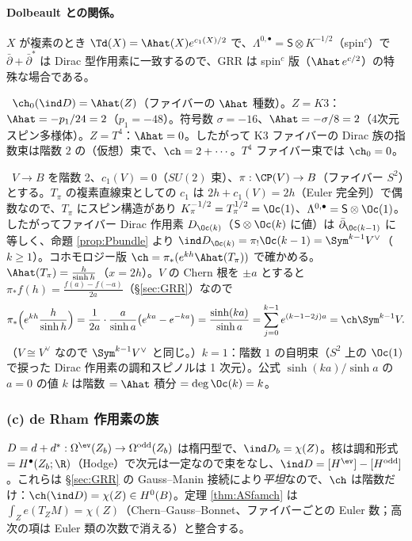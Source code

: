 \paragraph{Dolbeault との関係。}$X$ が複素のとき $\Td(X)=\Ahat(X)e^{c_1(X)/2}$ で、$\Lambda^{0,\bullet}=\mathsf S\otimes K^{-1/2}$（spin$^c$）で $\bar\partial+\bar\partial^*$ は Dirac 型作用素に一致するので、GRR は spin$^c$ 版（$\Ahat\,e^{c/2}$）の特殊な場合である。
\begin{ex}\label{ex:Ahatrank}\tP\
$\ch_0(\ind D)=\Ahat(Z)$（ファイバーの $\Ahat$ 種数）。$Z=K3$：$\Ahat=-p_1/24=2$（$p_1=-48$）。符号数 $\sigma=-16$、$\Ahat=-\sigma/8=2$（4次元スピン多様体）。$Z=T^4$：$\Ahat=0$。したがって K3 ファイバーの Dirac 族の指数束は階数 $2$ の（仮想）束で、$\ch=2+\cdots$。$T^4$ ファイバー束では $\ch_0=0$。
\end{ex}
\begin{ex}[$SU(2)$ 束の球面束]\label{ex:SU2}\tP\
$V\to B$ を階数 2、$c_1(V)=0$（$SU(2)$ 束）、$\pi:\CP(V)\to B$（ファイバー $S^2$）とする。$T_\pi$ の複素直線束としての $c_1$ は $2h+c_1(V)=2h$（Euler 完全列）で偶数なので、$T_\pi$ にスピン構造があり $K_\pi^{-1/2}=T_\pi^{1/2}=\Oc(1)$、$\Lambda^{0,\bullet}=\mathsf S\otimes\Oc(1)$。したがってファイバー Dirac 作用素 $D_{\Oc(k)}$（$\mathsf S\otimes\Oc(k)$ に値）は $\bar\partial_{\Oc(k-1)}$ に等しく、命題 \ref{prop:Pbundle} より $\ind D_{\Oc(k)}=\pi_!\Oc(k-1)=\Sym^{k-1}V^\vee$（$k\ge1$）。コホモロジー版 $\ch=\pi_*(e^{kh}\Ahat(T_\pi))$ で確かめる。$\Ahat(T_\pi)=\frac{h}{\sinh h}$（$x=2h$）。$V$ の Chern 根を $\pm a$ とすると $\pi_*f(h)=\frac{f(a)-f(-a)}{2a}$（\S\ref{sec:GRR}）なので
\[
\pi_*\Bigl(e^{kh}\frac h{\sinh h}\Bigr)=\frac{1}{2a}\cdot\frac{a}{\sinh a}\bigl(e^{ka}-e^{-ka}\bigr)=\frac{\sinh(ka)}{\sinh a}=\sum_{j=0}^{k-1}e^{(k-1-2j)a}=\ch\Sym^{k-1}V.
\]
（$V\cong V^\vee$ なので $\Sym^{k-1}V^\vee$ と同じ。）$k=1$：階数 $1$ の自明束（$S^2$ 上の $\Oc(1)$ で捩った Dirac 作用素の調和スピノルは 1 次元）。公式 $\sinh(ka)/\sinh a$ の $a=0$ の値 $k$ は階数 $=\Ahat$ 積分 $=\deg\Oc(k)=k$。
\end{ex}
\subsubsection{(c) de Rham 作用素の族}
$D=d+d^*:\Omega^{\ev}(Z_b)\to\Omega^{\rm odd}(Z_b)$ は楕円型で、$\ind D_b=\chi(Z)$。核は調和形式 $=H^\bullet(Z_b;\R)$（Hodge）で次元は一定なので束をなし、$\ind D=[H^{\ev}]-[H^{\rm odd}]$。これらは \S\ref{sec:GRR} の Gauss--Manin 接続により\emph{平坦}なので、$\ch$ は階数だけ：$\ch(\ind D)=\chi(Z)\in H^0(B)$。定理 \ref{thm:ASfamch} は $\int_Ze(T_ZM)=\chi(Z)$（Chern--Gauss--Bonnet、ファイバーごとの Euler 数；高次の項は Euler 類の次数で消える）と整合する。

